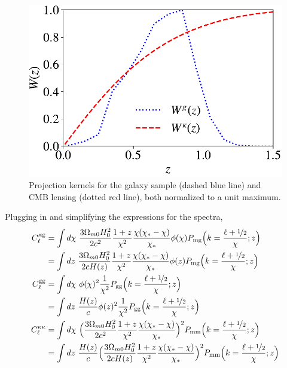 \documentclass[a4paper,usenatbib]{mnras}
\begin{document}
\begin{figure}
\includegraphics[width=\linewidth]{figures/windows.pdf}
\caption{Projection kernels for the galaxy sample (dashed blue line) and CMB lensing (dotted red line), both normalized to a unit maximum.}
\label{fig:kernels}
\end{figure}

Plugging in and simplifying the expressions for the spectra,
\begin{align}\label{eq:simplified_cells}
    C_{\ell}^{\rm \kappa g} &= \int d\chi \ \frac{3\Omega_{m0}H_0^2}{2c^2} \frac{1+z}{\chi^2}\frac{\chi(\chi_{\rm *}-\chi)}{\chi_{\rm *}}\phi(\chi)P_{\rm mg}{\Big (}k = \frac{\ell + 
\nicefrac{1}{2}}{\chi}; z{\Big )} \nonumber \\ %
    &= \int dz \ \frac{3\Omega_{m0}H_0^2}{2cH(z)} \frac{1+z}{\chi^2}\frac{\chi(\chi_{\rm *}-\chi)}{\chi_{\rm *}}\phi(z)P_{\rm mg}{\Big (}k = \frac{\ell + 
\nicefrac{1}{2}}{\chi}; z{\Big )}\nonumber \\ %
    C_{\ell}^{\rm gg} &= \int d\chi \ \phi(\chi)^2 \frac{1}{\chi^2} P_{\rm gg}{\Big (}k = \frac{\ell + 
\nicefrac{1}{2}}{\chi}; z{\Big )} \\ %
    &= \int dz \ \frac{H(z)}{c} \phi(z)^2 \frac{1}{\chi^2} P_{\rm gg}{\Big (}k = \frac{\ell + 
\nicefrac{1}{2}}{\chi}; z{\Big )} \nonumber \\ %
    C_{\ell}^{\kappa\kappa} &= \int d\chi \ {\Big (}\frac{3\Omega_{m0}H_0^2}{2c^2} \frac{1+z}{\chi^2}\frac{\chi(\chi_{\rm *}-\chi)}{\chi_{\rm *}}{\Big )}^2P_{\rm mm}{\Big (}k = \frac{\ell + 
\nicefrac{1}{2}}{\chi}; z{\Big )} \nonumber \\
    &= \int dz \ \frac{H(z)}{c}{\Big (}\frac{3\Omega_{m0}H_0^2}{2cH(z)} \frac{1+z}{\chi^2}\frac{\chi(\chi_{\rm *}-\chi)}{\chi_{\rm *}}{\Big )}^2P_{\rm mm}{\Big (}k = \frac{\ell + 
\nicefrac{1}{2}}{\chi}; z{\Big )} \nonumber
\end{align}
\end{document}
